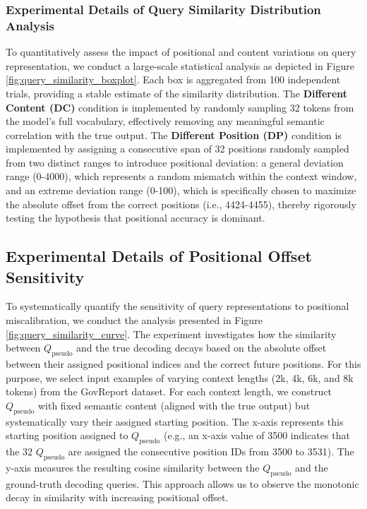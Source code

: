 \documentclass[11pt]{article}
\begin{document}
\subsubsection{Experimental Details of Query Similarity Distribution Analysis}
To quantitatively assess the impact of positional and content variations on query representation, we conduct a large-scale statistical analysis as depicted in Figure \ref{fig:query_similarity_boxplot}. Each box is aggregated from 100 independent trials, providing a stable estimate of the similarity distribution. The \textbf{Different Content (DC)} condition is implemented by randomly sampling 32 tokens from the model's full vocabulary, effectively removing any meaningful semantic correlation with the true output. The \textbf{Different Position (DP)} condition is implemented by assigning a consecutive span of 32 positions randomly sampled from two distinct ranges to introduce positional deviation: a general deviation range (0-4000), which represents a random mismatch within the context window, and an extreme deviation range (0-100), which is specifically chosen to maximize the absolute offset from the correct positions  (i.e., 4424-4455), thereby rigorously testing the hypothesis that positional accuracy is dominant.

\subsection{Experimental Details of Positional Offset Sensitivity}
To systematically quantify the sensitivity of query representations to positional miscalibration, we conduct the analysis presented in Figure \ref{fig:query_similarity_curve}. The experiment investigates how the similarity between \texorpdfstring{\(Q_{\text{pseudo}}\)}{Q\_pseudo} and the true decoding decays based on the absolute offset between their assigned positional indices and the correct future positions. For this purpose, we select input examples of varying context lengths (2k, 4k, 6k, and 8k tokens) from the GovReport dataset. For each context length, we construct \texorpdfstring{\(Q_{\text{pseudo}}\)}{Q\_pseudo} with fixed semantic content (aligned with the true output) but systematically vary their assigned starting position. The x-axis represents this starting position assigned to \texorpdfstring{\(Q_{\text{pseudo}}\)}{Q\_pseudo} (e.g., an x-axis value of 3500 indicates that the 32 \texorpdfstring{\(Q_{\text{pseudo}}\)}{Q\_pseudo} are assigned the consecutive position IDs from 3500 to 3531). The y-axis measures the resulting cosine similarity between the \texorpdfstring{\(Q_{\text{pseudo}}\)}{Q\_pseudo} and the ground-truth decoding queries. This approach allows us to observe the monotonic decay in similarity with increasing positional offset.
\end{document}

